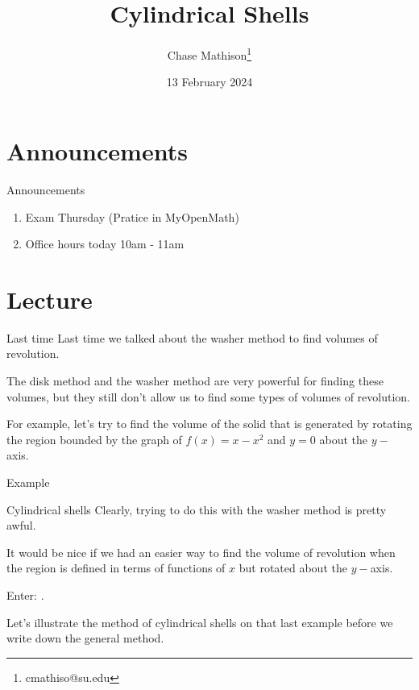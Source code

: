 \documentclass[presentation]{beamer}
\institute[SU]{Shenandoah University}
\author{Chase Mathison\thanks{cmathiso@su.edu}}
\date{13 February 2024}
\title{Cylindrical Shells}
\begin{document}
\maketitle

\section{Announcements}
\label{sec:orgde7ffd7}
\begin{frame}[label={sec:org64021e1}]{Announcements}
\begin{enumerate}
\item Exam Thursday (Pratice in MyOpenMath)
\item Office hours today 10am - 11am
\end{enumerate}
\end{frame}

\section{Lecture}
\label{sec:orgb89f0bb}
\begin{frame}[label={sec:orgf40841e}]{Last time}
Last time we talked about the washer method to find volumes of
revolution.

The disk method and the washer method are very powerful for finding
these volumes, but they still don't allow us to find some types of
volumes of revolution.

For example, let's try to find the volume of the solid that is
generated by rotating the region bounded by the graph of \(f \left( x
\right) = x - x^2\) and \(y = 0\) about the \(y-\)axis.
\end{frame}

\begin{frame}[label={sec:org53c6838}]{Example}
\end{frame}

\begin{frame}[label={sec:orgff50318}]{Cylindrical shells}
Clearly, trying to do this with the washer method is pretty awful.

It would be nice if we had an easier way to find the volume of
revolution when the region is defined in terms of functions of \(x\)
but rotated about the \(y-\)axis.

Enter: \uline{\hspace*{1in}}.

Let's illustrate the method of cylindrical shells on that last example
before we write down the general method.
\end{frame}
\end{document}
